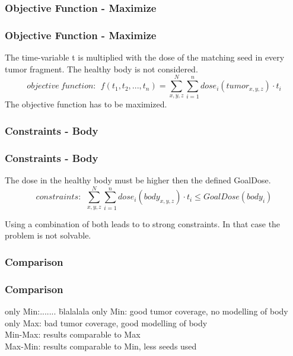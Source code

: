\documentclass{beamer}
\begin{document}
 \subsubsection{Objective Function - Maximize}
 \begin{frame}
 \frametitle{Objective Function - Maximize}
 The time-variable t is multiplied with the dose of the matching seed in every tumor fragment. The healthy body is not considered.
 \begin{equation}
 \label{eq:lp2}
 objective \ function: \ \ f(t_{1}, t_{2}, ... ,t_{n}) = 
 \sum_{x,y,z}^N \sum_{i=1}^n dose_{i}(tumor_{x,y,z}) \cdot t_{i}
 \end{equation}
 The objective function has to be maximized.
 \end{frame}
 
 \subsubsection{Constraints - Body}
 \begin{frame}
 \frametitle{Constraints - Body}
 The dose in the healthy body must be higher then the defined GoalDose.
 \begin{equation}
 \label{eq:constr2}
 constraints: \ \ \sum_{x,y,z}^N \sum_{i=1}^n dose_{i}(body_{x,y,z}) \cdot t_{i} \le GoalDose(body_{i})
 \end{equation}
 
 Using a combination of both leads to to strong constraints. In that case the problem is not solvable.
 \end{frame}
 
 \subsubsection{Comparison}
 \begin{frame}
 \frametitle{Comparison}
 \begin{tabbing}
    only Min:....... \=blalalala \kill
    only Min: \> good tumor coverage, no modelling of body \\
    only Max: \> bad tumor coverage, good modelling of body \\
    Min-Max: \> results comparable to Max \\
    Max-Min: \> results comparable to Min, less seeds used \\
  \end{tabbing}
 \end{frame}
 
 
\end{document}
